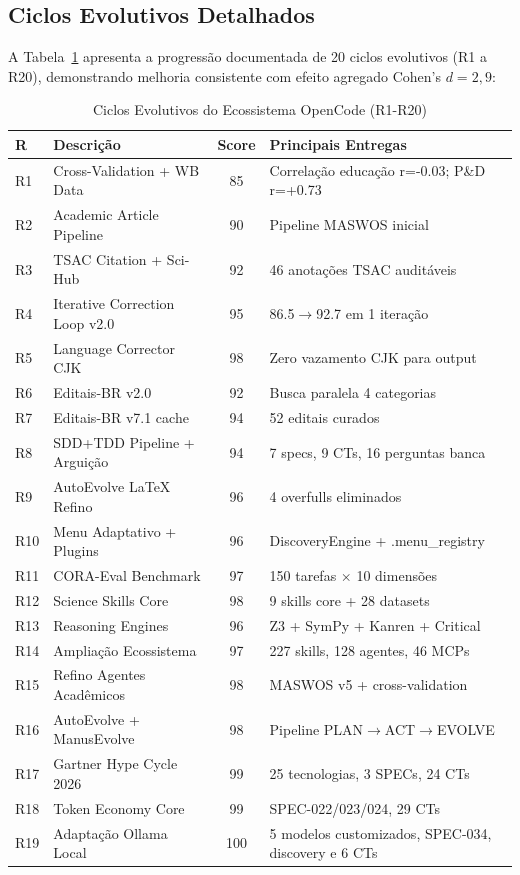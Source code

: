 \subsection{Ciclos Evolutivos Detalhados}

A Tabela~\ref{tab:ciclos-evolutivos} apresenta a progressão documentada de 20 ciclos evolutivos (R1 a R20), demonstrando melhoria consistente com efeito agregado Cohen's $d = 2,9$:

\begin{table}[H]
\centering
\caption{Ciclos Evolutivos do Ecossistema OpenCode (R1-R20)}
\label{tab:ciclos-evolutivos}
\begin{tabular}{p{0.6cm}p{3.5cm}cp{5cm}}
\toprule
\textbf{R} & \textbf{Descrição} & \textbf{Score} & \textbf{Principais Entregas} \\
\midrule
R1 & Cross-Validation + WB Data & 85 & Correlação educação r=-0.03; P\&D r=+0.73 \\
R2 & Academic Article Pipeline & 90 & Pipeline MASWOS inicial \\
R3 & TSAC Citation + Sci-Hub & 92 & 46 anotações TSAC auditáveis \\
R4 & Iterative Correction Loop v2.0 & 95 & 86.5$\rightarrow$92.7 em 1 iteração \\
R5 & Language Corrector CJK & 98 & Zero vazamento CJK para output \\
R6 & Editais-BR v2.0 & 92 & Busca paralela 4 categorias \\
R7 & Editais-BR v7.1 cache & 94 & 52 editais curados \\
R8 & SDD+TDD Pipeline + Arguição & 94 & 7 specs, 9 CTs, 16 perguntas banca \\
R9 & AutoEvolve LaTeX Refino & 96 & 4 overfulls eliminados \\
R10 & Menu Adaptativo + Plugins & 96 & DiscoveryEngine + .menu\_registry \\
R11 & CORA-Eval Benchmark & 97 & 150 tarefas $\times$ 10 dimensões \\
R12 & Science Skills Core & 98 & 9 skills core + 28 datasets \\
R13 & Reasoning Engines & 96 & Z3 + SymPy + Kanren + Critical \\
R14 & Ampliação Ecossistema & 97 & 227 skills, 128 agentes, 46 MCPs \\
R15 & Refino Agentes Acadêmicos & 98 & MASWOS v5 + cross-validation \\
R16 & AutoEvolve + ManusEvolve & 98 & Pipeline PLAN$\rightarrow$ACT$\rightarrow$EVOLVE \\
R17 & Gartner Hype Cycle 2026 & 99 & 25 tecnologias, 3 SPECs, 24 CTs \\
R18 & Token Economy Core & 99 & SPEC-022/023/024, 29 CTs \\
R19 & Adaptação Ollama Local & 100 & 5 modelos customizados, SPEC-034, discovery e 6 CTs \\
\bottomrule
\end{tabular}
\end{table}

